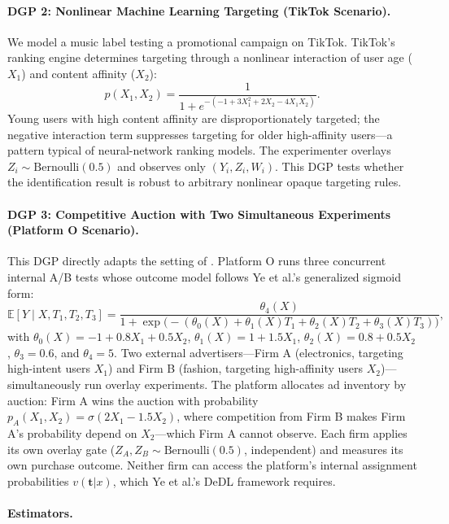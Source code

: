\documentclass[12pt]{article}
\newcommand{\E}{\mathbb{E}}
\begin{document}
\paragraph{DGP 2: Nonlinear Machine Learning Targeting (TikTok Scenario).}

We model a music label testing a promotional campaign on TikTok. TikTok's
ranking engine determines targeting through a nonlinear interaction of user
age ($X_1$) and content affinity ($X_2$):
\[
  p(X_1, X_2) = \frac{1}{1 + e^{-(-1 + 3X_1^2 + 2X_2 - 4X_1 X_2)}}.
\]
Young users with high content affinity are disproportionately targeted;
the negative interaction term suppresses targeting for older high-affinity
users---a pattern typical of neural-network ranking models. The experimenter
overlays $Z_i \sim \mathrm{Bernoulli}(0.5)$ and observes only $(Y_i, Z_i, W_i)$.
This DGP tests whether the identification result is robust to arbitrary
nonlinear opaque targeting rules.

\paragraph{DGP 3: Competitive Auction with Two Simultaneous Experiments
(Platform O Scenario).}

This DGP directly adapts the setting of \citet{ye2025deep}. Platform O runs
three concurrent internal A/B tests whose outcome model follows Ye et al.'s
generalized sigmoid form:
\[
  \E[Y \mid X, T_1, T_2, T_3]
  = \frac{\theta_4(X)}{1 + \exp\bigl(-(\theta_0(X) + \theta_1(X)T_1
     + \theta_2(X)T_2 + \theta_3(X)T_3)\bigr)},
\]
with $\theta_0(X) = -1 + 0.8X_1 + 0.5X_2$, $\theta_1(X) = 1 + 1.5X_1$,
$\theta_2(X) = 0.8 + 0.5X_2$, $\theta_3 = 0.6$, and $\theta_4 = 5$.
Two external advertisers---Firm A (electronics, targeting high-intent
users $X_1$) and Firm B (fashion, targeting high-affinity users $X_2$)---
simultaneously run overlay experiments. The platform allocates ad inventory
by auction: Firm A wins the auction with probability
$p_A(X_1, X_2) = \sigma(2X_1 - 1.5X_2)$, where competition from Firm B
makes Firm A's probability depend on $X_2$---which Firm A cannot observe.
Each firm applies its own overlay gate ($Z_A, Z_B \sim \mathrm{Bernoulli}(0.5)$,
independent) and measures its own purchase outcome. Neither firm can access
the platform's internal assignment probabilities $v(\mathbf{t}|x)$, which
Ye et al.'s DeDL framework requires.

\paragraph{Estimators.}
\end{document}
